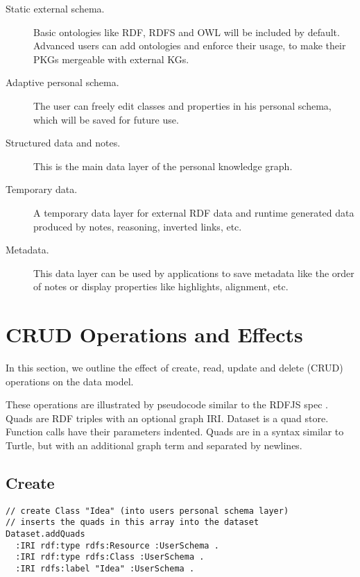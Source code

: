\begin{description}
  \item[Static external schema.] Basic ontologies like RDF, RDFS and OWL will be included by default. Advanced users can add ontologies and enforce their usage, to make their PKGs mergeable with external KGs.

  \item[Adaptive personal schema.] The user can freely edit classes and properties in his personal schema, which will be saved for future use.

  \item[Structured data and notes.] This is the main data layer of the personal knowledge graph.

  \item[Temporary data.] A temporary data layer for external RDF data and runtime generated data produced by notes, reasoning, inverted links, etc.

  \item[Metadata.] This data layer can be used by applications to save metadata like the order of notes or display properties like highlights, alignment, etc.
\end{description}






\section{CRUD Operations and Effects}

In this section, we outline the effect of create, read, update and delete (CRUD) operations on the data model.

These operations are illustrated by pseudocode similar to the RDFJS spec \cite{rdfjs}. Quads are RDF triples with an optional graph IRI. Dataset is a quad store. Function calls have their parameters indented. Quads are in a syntax similar to Turtle, but with an additional graph term and separated by newlines.

\subsection*{Create}

\begin{lstlisting}
// create Class "Idea" (into users personal schema layer)
// inserts the quads in this array into the dataset
Dataset.addQuads
  :IRI rdf:type rdfs:Resource :UserSchema .
  :IRI rdf:type rdfs:Class :UserSchema .
  :IRI rdfs:label "Idea" :UserSchema .
\end{lstlisting}

